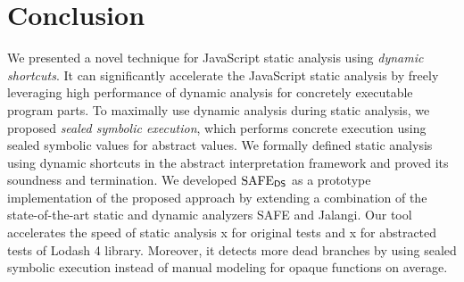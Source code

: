 \section{Conclusion}\label{sec:conclusion}
We presented a novel technique for JavaScript static analysis using \textit{dynamic shortcuts}.
It can significantly accelerate the JavaScript static
analysis by freely leveraging high performance of dynamic analysis for
concretely executable program parts.  To maximally use dynamic analysis during static analysis,
we proposed \textit{sealed symbolic execution}, which performs
concrete execution using sealed symbolic values for abstract values.
We formally defined static analysis using dynamic shortcuts in the
abstract interpretation framework and proved its soundness and termination.
We developed $\text{SAFE}_{\textsf{DS}}$ as a prototype implementation of the proposed approach
by extending a combination of the state-of-the-art static and dynamic
analyzers SAFE and Jalangi.  Our tool accelerates the speed
of static analysis x for original tests and x for
abstracted tests of Lodash 4 library.  Moreover, it detects  more
dead branches by using sealed symbolic execution instead of
manual modeling for  opaque functions on average.
